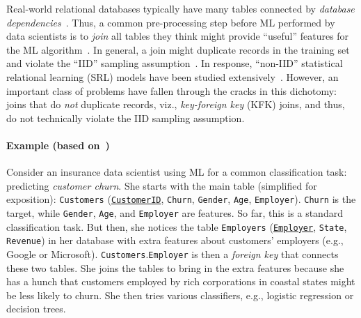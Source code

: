 \documentclass[sigconf]{acmart}
\begin{document}
Real-world relational databases typically have many tables connected by \textit{database dependencies}~\cite{cowbook}. Thus, a common pre-processing step 
before ML performed by data scientists is to \textit{join} all tables they think might provide ``useful'' features for the ML algorithm~\cite{crossmine,orion,rendle,hamlet,olteanuf}.
In general, a join might duplicate records in the training set and violate the ``IID'' sampling assumption~\cite{hastie}. 
In response, ``non-IID'' statistical relational learning (SRL) models have been studied extensively~\cite{srlbook}. 
However, an important class of problems have fallen through the cracks in this dichotomy: 
joins that do \textit{not} duplicate records, viz., \textit{key-foreign key} (KFK) joins, and thus, do not technically violate the IID sampling assumption.

\paragraph*{Example (based on~\cite{orion})}
Consider an insurance data scientist using ML for a common classification task: predicting \textit{customer churn}. She starts with the main table (simplified 
for exposition): \texttt{Customers} (\underline{\texttt{CustomerID}}, \texttt{Churn}, \texttt{Gender}, \texttt{Age}, \texttt{Employer}). 
\texttt{Churn} is the target, while \texttt{Gender}, \texttt{Age}, and \texttt{Employer} are features. So far, this is a standard classification task.  
But then, she notices the table \texttt{Employers} (\underline{\texttt{Employer}}, \texttt{State}, \texttt{Revenue}) in her database with extra features about 
customers' employers (e.g., Google or Microsoft). \texttt{Customers}.\texttt{Employer} is then a \textit{foreign key} that connects these two tables. 
She joins the tables to bring in the extra features because she has a hunch that customers employed by rich corporations in coastal states might be less likely 
to churn. She then tries various classifiers, e.g., logistic regression or decision trees.
\end{document}
